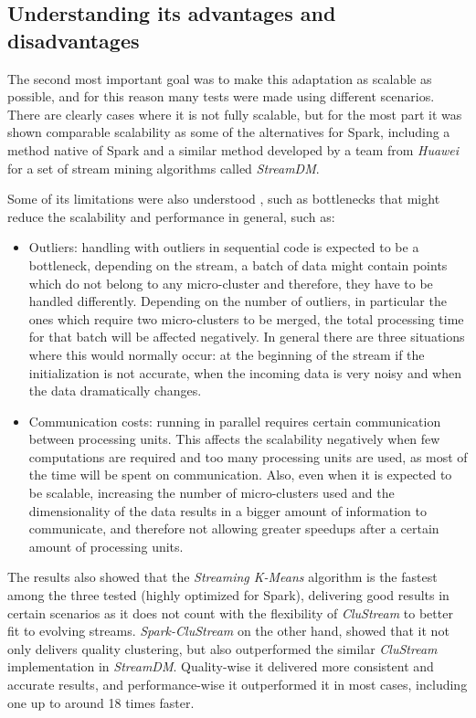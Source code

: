 \documentclass[10pt, conference, compsocconf]{IEEEtran}
\begin{document}
\subsection{Understanding its advantages and disadvantages}

The second most important goal was to make this adaptation as scalable as possible, and for this reason many tests were made using different scenarios. There are clearly cases where it is not fully scalable, but for the most part it was shown comparable scalability as some of the alternatives for Spark, including a method native of Spark and a similar method developed by a team from \textit{Huawei} for a set of stream mining algorithms called \textit{StreamDM}.

Some of its limitations were also understood , such as bottlenecks that might reduce the scalability and performance in general, such as:

\begin{itemize}
 \item Outliers: handling with outliers in sequential code is expected to be a bottleneck, depending on the stream, a batch of data might contain points which do not belong to any micro-cluster and therefore, they have to be handled differently. Depending on the number of outliers, in particular the ones which require two micro-clusters to be merged, the total processing time for that batch will be affected negatively. In general there are three situations where this would normally occur: at the beginning of the stream if the initialization is not accurate, when the incoming data is very noisy and when the data dramatically changes.
 \item Communication costs: running in parallel requires certain communication between processing units. This affects the scalability negatively when few computations are required and too many processing units are used, as most of the time will be spent on communication. Also, even when it is expected to be scalable, increasing the number of micro-clusters used and the dimensionality of the data results in a bigger amount of information to communicate, and therefore not allowing greater speedups after a certain amount of processing units. 
\end{itemize}

The results also showed that the \textit{Streaming K-Means} algorithm is the fastest among the three tested (highly optimized for Spark), delivering good results in certain scenarios as it does not count with the flexibility of \textit{CluStream} to better fit to evolving streams. \textit{Spark-CluStream} on the other hand, showed that it not only delivers quality clustering, but also outperformed the similar \textit{CluStream} implementation in \textit{StreamDM}. Quality-wise it delivered more consistent and accurate results, and performance-wise it outperformed it in most cases, including one up to around 18 times faster. 
\end{document}
